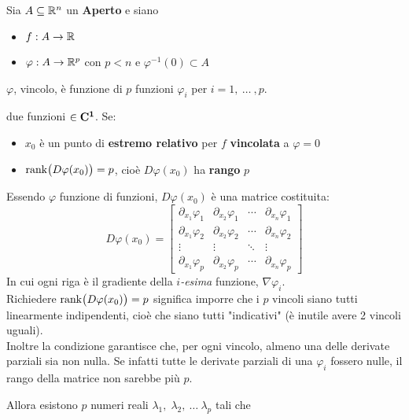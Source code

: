 \begin{theorem}
	\label{teo:molt_lagr_gen}
	Sia $A \subseteq \mathbb{R}^n$ un \textbf{Aperto} e siano
	\begin{itemize}[noitemsep]
		\item $f: A \to \mathbb{R}$
		\item $\varphi: A \to \mathbb{R}^p$ con $p < n$ e $\varphi^{-1}(0) \subset A$
	\end{itemize}
	\begin{note}
		$\varphi$, vincolo, è funzione di $p$ funzioni $\varphi_i$ per $i = 1,\:\dotsc\:,p$.
	\end{note}
	due funzioni $\in \mathbf{C^{1}}$.
	Se:
	\begin{itemize}[noitemsep]
		\item $x_0$ è un punto di \textbf{estremo relativo} per $f$ \textbf{vincolata} a $\varphi = 0$
		\item $\operatorname{rank} \bigl( D\varphi(x_0) \bigr) = p$, cioè $D\varphi(x_0)$ ha \textbf{rango} $p$
	\end{itemize}
	\begin{note}
		\hypertarget{note:teo_molt_lagr_gen}{}
		Essendo $\varphi$ funzione di funzioni, $D\varphi(x_0)$ è una matrice costituita:
		\[
			D\varphi(x_0) =
			\begin{bmatrix}
				\partial_{x_1} \varphi_1 & \partial_{x_2} \varphi_1 & \cdots & \partial_{x_n} \varphi_1\\
				\partial_{x_1} \varphi_2 & \partial_{x_2} \varphi_2 & \cdots & \partial_{x_n} \varphi_2\\
				\vdots & \vdots & \ddots & \vdots\\
				\partial_{x_1} \varphi_p & \partial_{x_2} \varphi_p & \cdots & \partial_{x_n} \varphi_p
			\end{bmatrix}
		\]
		In cui ogni riga è il gradiente della $i$\textit{-esima} funzione, $\nabla \varphi_i$.\\
		Richiedere $\operatorname{rank} \bigl( D\varphi(x_0) \bigr) = p$ significa imporre che i $p$ vincoli siano tutti linearmente indipendenti, cioè che siano tutti "indicativi" (è inutile avere 2 vincoli uguali).\\
		Inoltre la condizione garantisce che, per ogni vincolo, almeno una delle derivate parziali sia non nulla. Se infatti tutte le derivate parziali di una $\varphi_i$ fossero nulle, il rango della matrice non sarebbe più $p$.
	\end{note}
	Allora esistono $p$ numeri reali $\lambda_1,\; \lambda_2,\:\dotsc\:\lambda_p$ tali che

\end{theorem}
